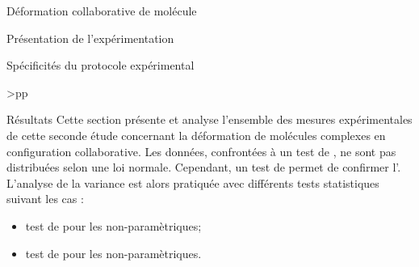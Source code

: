 \documentclass[myfrancais,ngerman,english,frenchb]{mythesis}
\begin{document}
\begin{mychapter}{Déformation collaborative de molécule}
\begin{mysection}{Présentation de l'expérimentation}
\begin{mysubsection}{Spécificités du protocole expérimental}
\begin{mytable}
\begin{mytabular}{>{\bfseries}p{\exptwofirstcolumn}p{\exptwosecondcolumn}}
						\mymiddlerule[\heavyrulewidth]
						 \\
						\mybottomrule
					\end{mytabular}
				\end{mytable}
			\end{mysubsection}
		\end{mysection}
		\begin{mysection}{Résultats}
			Cette section présente et analyse l'ensemble des mesures expérimentales de cette seconde étude concernant la déformation de molécules complexes en configuration collaborative.
			Les données, confrontées à un test de , ne sont pas distribuées selon une loi normale.
			Cependant, un test de  permet de confirmer l'.
			L'analyse de la variance est alors pratiquée avec différents tests statistiques suivant les cas :
			\begin{itemize}
				\item test de  pour les  non-paramètriques;
				\item test de  pour les  non-paramètriques.

\end{itemize}
\end{mysection}
\end{mychapter}
\end{document}
